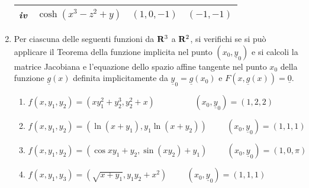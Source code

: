 \begin{enumerate}
\begin{center}
\begin{tabular}{|r||l|c|c|}
\hline
{\it iv} &$\cosh(x^3-z^2+y)$ & $(1,0,-1)$ & $(-1,-1)$ \\
\hline
\end{tabular}
\end{center}
\item Per ciascuna delle seguenti funzioni da ${\bf R}^3$ a ${\bf R}^2$,
si verifichi se si pu\`o
applicare il Teorema della funzione implicita nel punto $({x}_0,
\underline{y}_0)$
e si calcoli la matrice Jacobiana e l'equazione dello spazio
affine tangente nel punto ${x}_0$ della funzione $\underline{g}(x)$
definita implicitamente da $\underline{y}_0=\underline{g}({x}_0)$
e $F({x},\underline{g}({x}))=\underline{0}$.

\begin{enumerate}
\item $f(x,y_1,y_2)=(xy_1^2+y_2^3,y_2^2+x)\hspace{2cm}(x_0,\underline{y}_0)=(1,2,2)$
\item $f(x,y_1,y_2)=(\ln(x+y_1),y_1\ln(x+y_2))\hspace{1cm}(x_0,\underline{y}_0)=(1,1,1)$
\item $f(x,y_1,y_2)=(\cos{xy_1}+y_2,\sin(xy_2)+y_1)\hspace{1cm}(x_0,\underline{y}_0)=(1,0,\pi)$
\item $f(x,y_1,y_3)=(\sqrt{x+y_1},y_1y_2+x^2)\hspace{1cm}(x_0,\underline{y}_0)=(1,1,1)$
\end{enumerate}
\end{enumerate}

